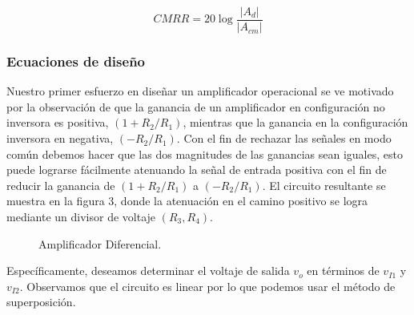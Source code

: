 \documentclass[12pt]{article}
\begin{document}
	\begin{tcolorbox}[colback=red!5!white,colframe=red!75!black,arc=0mm,boxrule=0mm,width=(\linewidth+0.5cm)]
		\begin{equation}
			CMRR = 20\log{\frac{|A_d|}{|A_{cm}|}}
		\end{equation}
	\end{tcolorbox}
	
	\subsubsection*{Ecuaciones de diseño}
	Nuestro primer esfuerzo en diseñar un amplificador operacional se ve motivado por la observación de que la ganancia de un amplificador en configuración no inversora es positiva, $(1+ R_2 / R_1 )$, mientras que la ganancia en la configuración inversora en negativa, $(-R_2 / R_1 )$. Con el fin de rechazar las señales en modo común debemos hacer que las dos magnitudes de las ganancias sean iguales, esto puede lograrse fácilmente atenuando la señal de entrada positiva con el fin  de reducir la ganancia de $(1+ R_2 / R_1 )$ a $(-R_2 / R_1 )$. El circuito resultante se muestra en la figura 3, donde la atenuación en el camino positivo se logra mediante un divisor de voltaje $(R_3,R_4 )$.
	
	\begin{figure}[H]
		\centering	
		\caption{Amplificador Diferencial.}	
		\label{fig:figura3}
	\end{figure}
	
	\noindent Específicamente, deseamos determinar el voltaje de salida $v_o$ en términos de $v_{I1}$ y $v_{I2}$. Observamos que el circuito es linear por lo que podemos usar el método de superposición.\\
	
\end{document}
